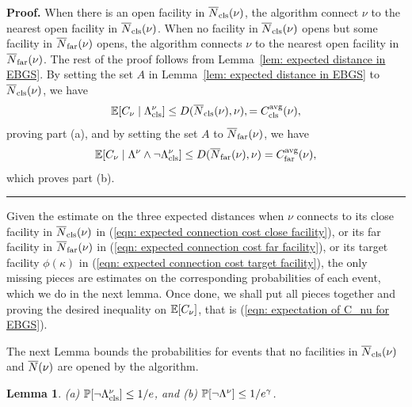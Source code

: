 \documentclass[oneside,final]{ucr}
\newtheorem{lemma}[theorem]{Lemma}
\newenvironment{proof}[1][Proof]{\textbf{#1.} }{\ \rule{0.5em}{0.5em}}
\begin{document}
\begin{proof}
When there is an open facility in ${\overline{N}}_{{\mbox{\scriptsize\rm cls}}}(\nu)$, the algorithm
  connect $\nu$ to the nearest open facility in
  ${\overline{N}}_{{\mbox{\scriptsize\rm cls}}}(\nu)$. When no facility in ${\overline{N}}_{{\mbox{\scriptsize\rm cls}}}(\nu)$ opens but
  some facility in ${\overline{N}}_{{\mbox{\scriptsize\rm far}}}(\nu)$ opens, the algorithm connects
  $\nu$ to the nearest open facility in ${\overline{N}}_{{\mbox{\scriptsize\rm far}}}(\nu)$. The rest of
  the proof follows from Lemma~\ref{lem: expected distance in
    EBGS}. By setting the set $A$ in Lemma~\ref{lem: expected distance
    in EBGS} to ${\overline{N}}_{{\mbox{\scriptsize\rm cls}}}(\nu)$, we have
%
  \begin{equation*}
    \mathbb{E}[C_{\nu} \mid \Lambda_{{\mbox{\scriptsize\rm cls}}}^\nu] \leq D({\overline{N}}_{{\mbox{\scriptsize\rm cls}}}(\nu), \nu),
    = C_{{\mbox{\scriptsize\rm cls}}}^{{\mbox{\scriptsize\rm avg}}}(\nu),
    \label{eqn: expected connection cost close facility}
  \end{equation*}
% 
proving part (a), and by setting the set $A$ to ${\overline{N}}_{{\mbox{\scriptsize\rm far}}}(\nu)$, we have
%
  \begin{equation*}
    \mathbb{E}[C_{\nu}
    \mid \Lambda^\nu \wedge \neg \Lambda_{{\mbox{\scriptsize\rm cls}}}^\nu] \leq
    D({\overline{N}}_{{\mbox{\scriptsize\rm far}}}(\nu), \nu) = C_{{\mbox{\scriptsize\rm far}}}^{{\mbox{\scriptsize\rm avg}}}(\nu),
    \label{eqn: expected connection cost far facility}
  \end{equation*}
which proves part (b).
\end{proof}

Given the estimate on the three expected distances when $\nu$ connects
to its close facility in ${\overline{N}}_{{\mbox{\scriptsize\rm cls}}}(\nu)$ in (\ref{eqn: expected
  connection cost close facility}), or its far facility in
${\overline{N}}_{{\mbox{\scriptsize\rm far}}}(\nu)$ in (\ref{eqn: expected connection cost far
  facility}), or its target facility $\phi(\kappa)$ in (\ref{eqn:
  expected connection cost target facility}), the only missing pieces
are estimates on the corresponding probabilities of each event, which
we do in the next lemma. Once done, we shall put all pieces together
and proving the desired inequality on $\mathbb{E}[C_{\nu}]$, that is
(\ref{eqn: expectation of C_nu for EBGS}).

The next Lemma bounds the probabilities for events
that no facilities in ${\overline{N}}_{{\mbox{\scriptsize\rm cls}}}(\nu)$ and ${\overline{N}}(\nu)$ are
opened by the algorithm.


\begin{lemma}\label{lem: close and far neighbor probability}
{\rm (a)} $\mathbb{P}[\neg\Lambda^\nu_{{\mbox{\scriptsize\rm cls}}}] \le 1/e$, and
{\rm (b)} $\mathbb{P}[\neg\Lambda^\nu] \le 1/e^\gamma$.
\end{lemma}
\end{document}
